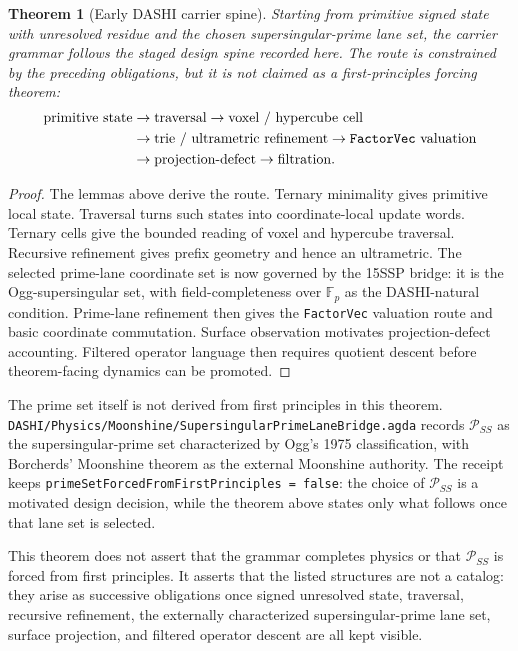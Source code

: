 \documentclass[11pt]{article}
\theoremstyle{definition}
\theoremstyle{plain}
\newtheorem{theorem}[definition]{Theorem}
\theoremstyle{remark}
\begin{document}
\begin{theorem}[Early DASHI carrier spine]
Starting from primitive signed state with unresolved residue and the chosen
supersingular-prime lane set, the carrier grammar follows the staged design
spine recorded here. The route is constrained by the preceding obligations, but
it is not claimed as a first-principles forcing theorem:
\[
\begin{aligned}
\text{primitive state}
&\to \text{traversal}
\to \text{voxel / hypercube cell}\\
&\to \text{trie / ultrametric refinement}
\to \text{\texttt{FactorVec} valuation}\\
&\to \text{projection-defect}
\to \text{filtration}.
\end{aligned}
\]
\end{theorem}
\begin{proof}
The lemmas above derive the route. Ternary minimality gives primitive local
state. Traversal turns such states into coordinate-local update words. Ternary
cells give the bounded reading of voxel and hypercube traversal. Recursive
refinement gives prefix geometry and hence an ultrametric. The selected
prime-lane coordinate set is now governed by the 15SSP bridge: it is the
Ogg-supersingular set, with field-completeness over \(\mathbb{F}_p\) as the
DASHI-natural condition. Prime-lane refinement then gives the
\texttt{FactorVec} valuation route and basic coordinate commutation. Surface
observation motivates projection-defect accounting. Filtered
operator language then requires quotient descent before theorem-facing
dynamics can be promoted.
\end{proof}

The prime set itself is not derived from first principles in this theorem.
\texttt{DASHI/Physics/Moonshine/SupersingularPrimeLaneBridge.agda} records
\(\mathcal{P}_{SS}\) as the supersingular-prime set characterized by Ogg's
1975 classification, with Borcherds' Moonshine theorem as the external
Moonshine authority. The receipt keeps
\texttt{primeSetForcedFromFirstPrinciples = false}: the choice of
\(\mathcal{P}_{SS}\) is a motivated design decision, while the theorem above
states only what follows once that lane set is selected.

This theorem does not assert that the grammar completes physics or that
\(\mathcal{P}_{SS}\) is forced from first principles. It asserts that the
listed structures are not a catalog: they arise as successive obligations once
signed unresolved state, traversal, recursive refinement, the externally
characterized supersingular-prime lane set, surface projection, and filtered
operator descent are all kept visible.
\end{document}
